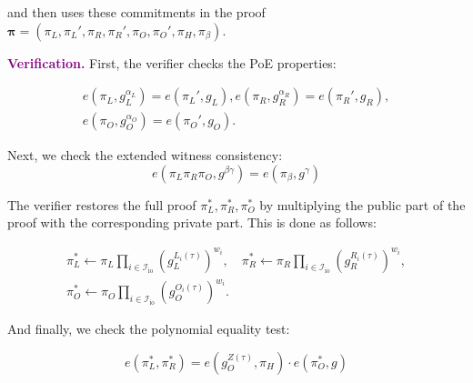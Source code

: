 \documentclass[../lecture-notes.tex]{subfiles}
\begin{document}
and then uses these commitments in the proof $\boldsymbol{\pi} = (\pi_L,\pi_L',\pi_R,\pi_R',\pi_O,\pi_O',\pi_H,\pi_{\beta})$.

\vspace{1mm}

\textcolor{purple}{\textbf{Verification.}} First, the verifier checks the PoE properties:

\vspace{-5mm}

\begin{gather*}
        e(\pi_L, g_L^{\alpha_L}) = e(\pi_L', g_L), e(\pi_R, g_R^{\alpha_R}) = e(\pi_R', g_R), \\ e(\pi_O, g_O^{\alpha_O}) = e(\pi_O', g_O).
\end{gather*}

Next, we check the extended witness consistency:
\begin{equation*}
    e(\pi_L\pi_R\pi_O, g^{\beta\gamma}) = e(\pi_{\beta}, g^{\gamma})
\end{equation*}

The verifier restores the full proof $\pi_L^*,\pi_R^*,\pi_O^*$ by multiplying the public part of the proof with the corresponding private part. This is done as follows:

\vspace{-4mm}

\begin{gather*}
        \pi_L^* \gets \pi_L\prod_{i \in \mathcal{I}_{\text{io}}} (g_L^{L_i(\tau)})^{w_i}, \quad 
        \pi_R^* \gets \pi_R\prod_{i \in \mathcal{I}_{\text{io}}} (g_R^{R_i(\tau)})^{w_i}, \\
        \pi_O^* \gets \pi_O\prod_{i \in \mathcal{I}_{\text{io}}} (g_O^{O_i(\tau)})^{w_i}.        
\end{gather*}

\vspace{-2mm}

And finally, we check the polynomial equality test:

\vspace{-2mm}

\begin{equation*}
    e(\pi_L^*, \pi_R^*) = e(g_O^{Z(\tau)}, \pi_H)\cdot e(\pi_O^*, g)
\end{equation*}
\end{document}
